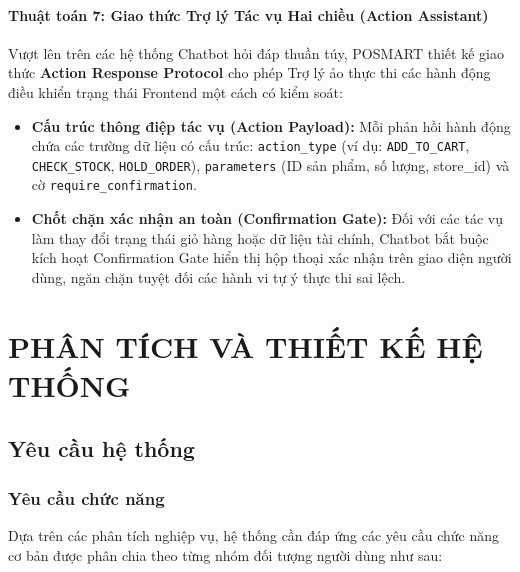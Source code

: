 \documentclass[12pt,a4paper]{report}
\begin{document}
\subsubsection{Thuật toán 7: Giao thức Trợ lý Tác vụ Hai chiều (Action Assistant)}
Vượt lên trên các hệ thống Chatbot hỏi đáp thuần túy, POSMART thiết kế giao thức \textbf{Action Response Protocol} cho phép Trợ lý ảo thực thi các hành động điều khiển trạng thái Frontend một cách có kiểm soát:
\begin{itemize}
    \item \textbf{Cấu trúc thông điệp tác vụ (Action Payload):} Mỗi phản hồi hành động chứa các trường dữ liệu có cấu trúc: \texttt{action\_type} (ví dụ: \texttt{ADD\_TO\_CART}, \texttt{CHECK\_STOCK}, \texttt{HOLD\_ORDER}), \texttt{parameters} (ID sản phẩm, số lượng, store\_id) và cờ \texttt{require\_confirmation}.
    \item \textbf{Chốt chặn xác nhận an toàn (Confirmation Gate):} Đối với các tác vụ làm thay đổi trạng thái giỏ hàng hoặc dữ liệu tài chính, Chatbot bắt buộc kích hoạt Confirmation Gate hiển thị hộp thoại xác nhận trên giao diện người dùng, ngăn chặn tuyệt đối các hành vi tự ý thực thi sai lệch.
\end{itemize}
 

\chapter{PHÂN TÍCH VÀ THIẾT KẾ HỆ THỐNG}

\section{Yêu cầu hệ thống}

\subsection{Yêu cầu chức năng}
Dựa trên các phân tích nghiệp vụ, hệ thống cần đáp ứng các yêu cầu chức năng cơ bản được phân chia theo từng nhóm đối tượng người dùng như sau:
\end{document}
